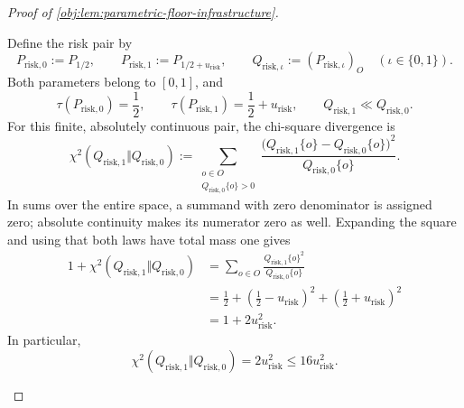 \begin{proof}[Proof of \cref{obj:lem:parametric-floor-infrastructure}]
\begin{enumerate}
Define the risk pair by
\[
P_{\mathrm{risk},0}:=P_{1/2},
\qquad
P_{\mathrm{risk},1}:=P_{1/2+u_{\mathrm{risk}}},
\qquad
Q_{\mathrm{risk},\iota}:=(P_{\mathrm{risk},\iota})_O
\quad(\iota\in\{0,1\}).
\]
Both parameters belong to \([0,1]\), and
\[
\tau(P_{\mathrm{risk},0})=\frac12,
\qquad
\tau(P_{\mathrm{risk},1})=\frac12+u_{\mathrm{risk}},
\qquad
Q_{\mathrm{risk},1}\ll Q_{\mathrm{risk},0}.
\]
For this finite, absolutely continuous pair, the chi-square divergence is
\[
\chi^2(Q_{\mathrm{risk},1}\Vert Q_{\mathrm{risk},0})
:=
\sum_{\substack{o\in O\\Q_{\mathrm{risk},0}\{o\}>0}}
\frac{\bigl(Q_{\mathrm{risk},1}\{o\}
             -Q_{\mathrm{risk},0}\{o\}\bigr)^2}
     {Q_{\mathrm{risk},0}\{o\}}.
\]
In sums over the entire space, a summand with zero denominator is assigned zero; absolute continuity makes its numerator zero as well. Expanding the square and using that both laws have total mass one gives
\[
\begin{aligned}
1+\chi^2(Q_{\mathrm{risk},1}\Vert Q_{\mathrm{risk},0})
&=
\sum_{o\in O}
\frac{Q_{\mathrm{risk},1}\{o\}^2}
     {Q_{\mathrm{risk},0}\{o\}}\\
&=
\frac12+
\left(\frac12-u_{\mathrm{risk}}\right)^2+
\left(\frac12+u_{\mathrm{risk}}\right)^2\\
&=1+2u_{\mathrm{risk}}^2.
\end{aligned}
\]
In particular,
\[
\chi^2(Q_{\mathrm{risk},1}\Vert Q_{\mathrm{risk},0})
=2u_{\mathrm{risk}}^2
\le16u_{\mathrm{risk}}^2.
\]


\end{enumerate}
\end{proof}

